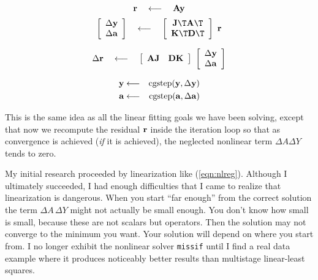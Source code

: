\begin{equation}
 \bold r 
 \quad\longleftarrow\quad
 \bold A \bold y 
\label{eqn:progfirst}
\end{equation}
\begin{equation}
        \left[
        \begin{array}{c}
        \Delta \bold y \\
        \Delta \bold a
        \end{array}
        \right]
 \quad\longleftarrow\quad
        \left[
        \begin{array}{c}
        \bold J\T \bold A\T \\
        \bold K\T \bold D\T
        \end{array}
        \right]
        \
        \bold r
\end{equation}

\begin{equation}
 \Delta \bold r
 \quad\longleftarrow\quad
 \left[
 \begin{array}{cc}
   \bold A \bold J   &   \bold D \bold K 
 \end{array}
 \right]
 \
 \left[
 \begin{array}{c}
   \Delta \bold y \\
   \Delta \bold a
 \end{array}
 \right]
\end{equation}

\begin{eqnarray}
\bold y &\longleftarrow& {\rm cgstep}( \bold y, \Delta \bold y) \\ 
\bold a &\longleftarrow& {\rm cgstep}( \bold a, \Delta \bold a)
\label{eqn:proglast}
\end{eqnarray}
\par\noindent
This is the same idea as all the linear fitting goals we have been solving,
except that now we recompute
the residual $\bold r$ inside the iteration loop
so that as convergence is achieved ({\it if} it is achieved),
the neglected nonlinear term $\Delta A \Delta Y$ tends to zero.

\par
My initial research proceeded by linearization like (\ref{eqn:nlreg}).
Although I ultimately succeeded,
I had enough difficulties that
I came to realize that linearization is dangerous.
When you start ``far enough'' from the correct solution
the term $ \Delta A\, \Delta Y $
might not actually be small enough.
You don't know how small is small,
because these are not scalars but operators.
Then the solution may not converge to the minimum you want.
Your solution will depend on where you start from.
I no longer exhibit the nonlinear solver \texttt{missif}
until I find a real data example where it produces noticeably better results
than multistage linear-least squares.


